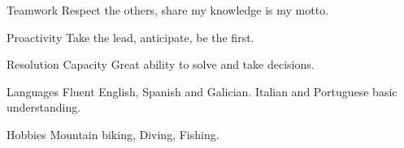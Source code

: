 

\begin{cvskills}

  \cvskill
    {Teamwork} %
    {Respect the others, share my knowledge is my motto.} %

  \cvskill
    {Proactivity} %
    {Take the lead, anticipate, be the first.} %

  \cvskill
    {Resolution Capacity} %
    {Great ability to solve and take decisions.} %

  \cvskill
    {Languages} %
    {Fluent English, Spanish and Galician. Italian and Portuguese basic understanding.} %

  \cvskill
    {Hobbies} %
    {Mountain biking, Diving, Fishing.} %


\end{cvskills}
